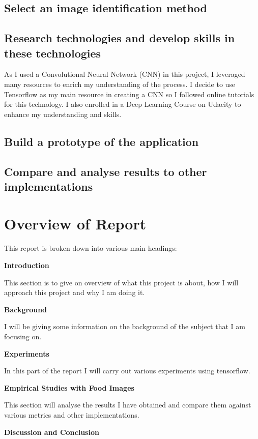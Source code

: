 \subsection{Select an image identification method}

\subsection{Research technologies and develop skills in these technologies}
As I used a Convolutional Neural Network (CNN) in this project, I leveraged many resources to enrich my understanding of the process.
I decide to use Tensorflow as my main resource in creating a CNN so I followed online tutorials for this technology.
I also enrolled in a Deep Learning Course on Udacity to enhance my understanding and skills.

\subsection{Build a prototype of the application}

\subsection{Compare and analyse results to other implementations}


\section{Overview of Report}

This report is broken down into various main headings:

\textbf{Introduction}

This section is to give on overview of what this project is about, how I will approach this project and why I am doing it.

\textbf{Background}

I will be giving some information on the background of the subject that I am focusing on.

\textbf{Experiments}

In this part of the report I will carry out various experiments using
tensorflow.

\textbf{Empirical Studies with Food Images}

This section will analyse the results I have obtained and compare them against various metrics and other implementations.

\textbf{Discussion and Conclusion}

